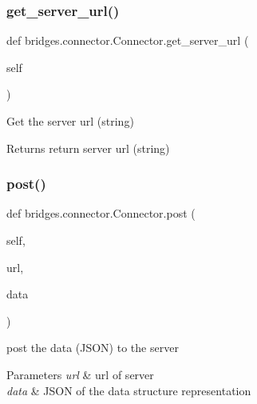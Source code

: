 \subsubsection{\texorpdfstring{get\+\_\+server\+\_\+url()}{get\_server\_url()}}
{\footnotesize\ttfamily def bridges.\+connector.\+Connector.\+get\+\_\+server\+\_\+url (\begin{DoxyParamCaption}\item[{}]{self }\end{DoxyParamCaption})}



Get the server url (string) 

\begin{DoxyReturn}{Returns}
return server url (string) 
\end{DoxyReturn}
\mbox{\label{classbridges_1_1connector_1_1_connector_abfc36138302d5ec49219cb3ccf48439a}} 
\subsubsection{\texorpdfstring{post()}{post()}}
{\footnotesize\ttfamily def bridges.\+connector.\+Connector.\+post (\begin{DoxyParamCaption}\item[{}]{self,  }\item[{}]{url,  }\item[{}]{data }\end{DoxyParamCaption})}



post the data (J\+S\+ON) to the server 


\begin{DoxyParams}{Parameters}
{\em url} & url of server \\
\hline
{\em data} & J\+S\+ON of the data structure representation \\
\hline
\end{DoxyParams}
\mbox{\label{classbridges_1_1connector_1_1_connector_afcd39dd1f2f37a945e16254e0fed178b}} 
